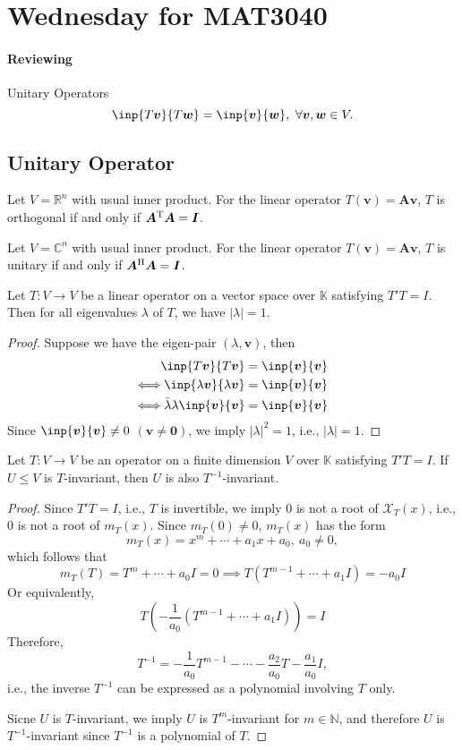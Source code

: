 
\section{Wednesday for MAT3040}

\paragraph{Reviewing}
Unitary Operators
\[
\inp{T\bm v}{T\bm w}=\inp{\bm v}{\bm w},\ \forall \bm v,\bm w\in V.
\]
\subsection{Unitary Operator}
\begin{example}
Let $V=\mathbb{R}^n$ with usual inner product.
For the linear operator $T(\bm v) =\bm A\bm v$, $T$ is orthogonal if and only if $\bm A^{\mathrm T}\bm A=\bm I$.

Let $V=\mathbb{C}^n$ with usual inner product.
For the linear operator $T(\bm v) =\bm A\bm v$, $T$ is unitary if and only if $\bm A^{\mathrm H}\bm A=\bm I$.
\end{example}

\begin{proposition}
Let $T:V\to V$ be a linear operator on a vector space over $\mathbb{K}$ satisfying $T'T=I$.
Then for all eigenvalues $\lambda$ of $T$, we have $|\lambda|=1$.
\end{proposition}

\begin{proof}
Suppose we have the eigen-pair $(\lambda,\bm v)$, then
\begin{align*}
\inp{T\bm v}{T\bm v}&=\inp{\bm v}{\bm v}\\
\Longleftrightarrow\inp{\lambda\bm v}{\lambda\bm v}&=\inp{\bm v}{\bm v}\\
\Longleftrightarrow\bar{\lambda}\lambda \inp{\bm v}{\bm v}&=\inp{\bm v}{\bm v}
\end{align*}
Since $\inp{\bm v}{\bm v}\ne0$ $(\bm v\ne\bm0)$, we imply $|\lambda|^2=1$, i.e., $|\lambda|=1$.
\end{proof}


\begin{proposition}
Let $T:V\to V$ be an operator on a finite dimension $V$ over $\mathbb{K}$ satisfying $T'T=I$.
If $U\le V$ is $T$-invariant, then $U$ is also $T^{-1}$-invariant.
\end{proposition}
\begin{proof}
Since $T'T=I$, i.e., $T$ is invertible, we imply $0$ is not a root of $\mathcal{X}_T(x)$, i.e., $0$ is not a root of $m_T(x)$.
Since $m_T(0)\ne0$, $m_T(x)$ has the form
\[
m_T(x) = x^m+\cdots+a_1x+a_0,\ a_0\ne0,
\]
which follows that
\[
m_T(T)=T^m+\cdots+a_0I=0
\implies
T(T^{m-1}+\cdots+a_1I)=-a_0I
\]
Or equivalently,
\[
T\left(
-\frac{1}{a_0}
(T^{m-1}+\cdots+a_1I)
\right)=I
\]
Therefore, 
\[
T^{-1} = -\frac{1}{a_0}T^{m-1}-\cdots-\frac{a_2}{a_0}T-\frac{a_1}{a_0}I,
\]
i.e., the inverse $T^{-1}$ can be expressed as a polynomial involving $T$ only.

Sicne $U$ is $T$-invariant, we imply $U$ is $T^m$-invariant for $m\in\mathbb{N}$, and therefore $U$ is $T^{-1}$-invariant since $T^{-1}$ is a polynomial of $T$.
\end{proof}

